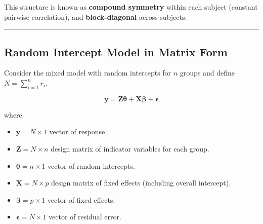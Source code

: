 \documentclass[
  letterpaper,
  DIV=11,
  numbers=noendperiod]{scrreprt}
\begin{document}
This structure is known as \textbf{compound symmetry} within each
subject (constant pairwise correlation), and \textbf{block-diagonal}
across subjects.

\begin{center}\rule{0.5\linewidth}{0.5pt}\end{center}

\hypertarget{random-intercept-model-in-matrix-form}{%
\subsection*{Random Intercept Model in Matrix
Form}\label{random-intercept-model-in-matrix-form}}

Consider the mixed model with random intercepts for \(n\) groups and
define \(N = \sum_{i=1}^n r_i\).

\[
\mathbf{y} = \mathbf{Z} \mathbf{\theta} + \mathbf{X}\mathbf{\beta} + \mathbf{\epsilon}
\]

where

\begin{itemize}
\item
  \(\mathbf{y} = N \times 1\) vector of response
\item
  \(\mathbf{Z} = N \times n\) design matrix of indicator variables for
  each group.
\item
  \(\mathbf{\theta} = n \times 1\) vector of random intercepts.
\item
  \(\mathbf{X} = N\times p\) design matrix of fixed effects (including
  overall intercept).
\item
  \(\mathbf{\beta} = p\times 1\) vector of fixed effects.
\item
  \(\mathbf{\epsilon} = N \times 1\) vector of residual error.
\end{itemize}
\end{document}
